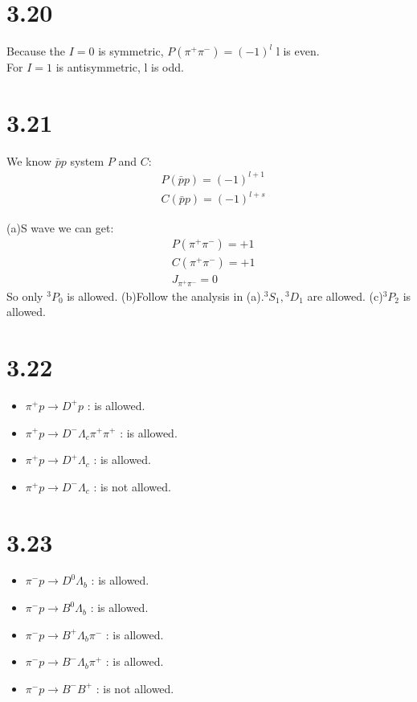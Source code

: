 \documentclass{article}
\begin{document}
\begin{CJK*}{GBK}{song}
\section{3.20}
Because the $I=0$ is symmetric, $P(\pi^+\pi^-)=(-1)^l$ l is even.\\
For $I=1$ is antisymmetric, l is odd.



\section{3.21}
We know $\bar{p}p$ system $P$ and $C$:
\begin{equation}
\begin{aligned}
&P(\bar{p}p)=(-1)^{l+1}\\
&C(\bar{p}p)=(-1)^{l+s}
\end{aligned}
\end{equation}

(a)S wave we can get:
\begin{equation}
\begin{aligned}
&P(\pi^+\pi^-)=+1\\
&C(\pi^+\pi^-)=+1\\
&J_{\pi^+\pi^-}=0
\end{aligned}
\end{equation}
So only ${}^3P_0$ is allowed.
(b)Follow the analysis in (a).${}^3S_1, {}^3D_1$ are allowed.
(c)${}^3P_2$ is allowed.


\section{3.22}
\begin{itemize}
\item $\pi^+p\rightarrow D^+p$ : is allowed.
\item $\pi^+p\rightarrow D^-\Lambda_c\pi^+\pi^+$ : is allowed.
\item $\pi^+p\rightarrow D^+\Lambda_c$ : is allowed.
\item $\pi^+p\rightarrow D^-\Lambda_c$ : is not allowed.
\end{itemize}

\section{3.23}
\begin{itemize}
\item $\pi^-p\rightarrow D^0\Lambda_b$ : is allowed.
\item $\pi^-p\rightarrow B^0\Lambda_b$ : is allowed.
\item $\pi^-p\rightarrow B^+\Lambda_b\pi^-$ : is allowed.
\item $\pi^-p\rightarrow B^-\Lambda_b\pi^+$ : is allowed.
\item $\pi^-p\rightarrow B^-B^+$ : is not allowed.
\end{itemize}


\end{CJK*}
\end{document}
